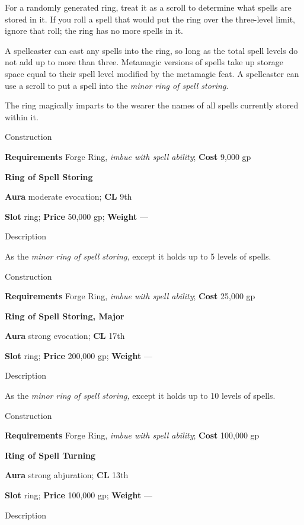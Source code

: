 For a randomly generated ring, treat it as a scroll to determine what spells are stored in it. If you roll a spell that would put the ring over the three-level limit, ignore that roll; the ring has no more spells in it.
				
A spellcaster can cast any spells into the ring, so long as the total spell levels do not add up to more than three. Metamagic versions of spells take up storage space equal to their spell level modified by the metamagic feat. A spellcaster can use a scroll to put a spell into the \textit{minor ring of spell storing}.
				
The ring magically imparts to the wearer the names of all spells currently stored within it. 
				
Construction
				
\textbf{Requirements} Forge Ring, \textit{imbue with spell ability}; \textbf{Cost }9,000 gp
				
\textbf{Ring of Spell Storing}
				
\textbf{Aura} moderate evocation;\textbf{ CL }9th
				
\textbf{Slot} ring; \textbf{Price} 50,000 gp; \textbf{Weight} ---
				
Description
				
As the \textit{minor ring of spell storing, }except it holds up to 5 levels of spells. 
				
Construction
				
\textbf{Requirements} Forge Ring, \textit{imbue with spell ability}; \textbf{Cost }25,000 gp
				
\textbf{Ring of Spell Storing, Major}
				
\textbf{Aura} strong evocation;\textbf{ CL }17th
				
\textbf{Slot} ring; \textbf{Price} 200,000 gp; \textbf{Weight} ---
				
Description
				
As the \textit{minor ring of spell storing, }except it holds up to 10 levels of spells. 
				
Construction
				
\textbf{Requirements} Forge Ring, \textit{imbue with spell ability}; \textbf{Cost }100,000 gp
				
\textbf{Ring of Spell Turning}
				
\textbf{Aura} strong abjuration;\textbf{ CL }13th
				
\textbf{Slot} ring; \textbf{Price} 100,000 gp; \textbf{Weight} ---
				
Description
				
